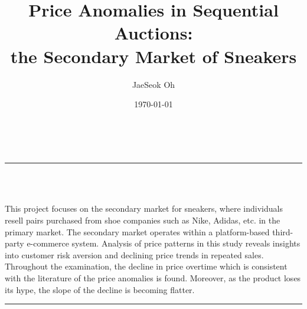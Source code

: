 \documentclass[a4paper]{article}
\title{\Huge{\bf{Price Anomalies in Sequential Auctions:}} \\
		 \huge the Secondary Market of Sneakers}
\author{\Large{JaeSeok Oh}}
\date{\today}
\theoremstyle{definition}
\theoremstyle{definition}
\theoremstyle{remark}
\begin{document}
	
\begin{titlepage}
	\maketitle
	\begin{Large}
		\begin{center}
			\vspace{3cm}
			\vspace{2cm} \\
		\end{center}
	\end{Large}
	\begin{large}
	\begin{center}	
	\noindent\rule{17cm}{0.4pt} \\
	 \\
	\end{center}

			 This project focuses on the secondary market for sneakers, where individuals resell pairs purchased from shoe companies such as Nike, Adidas, etc. in the primary market. The secondary market operates within a platform-based third-party e-commerce system. Analysis of price patterns in this study reveals insights into customer risk aversion and declining price trends in repeated sales. Throughout the examination, the decline in price overtime which is consistent with the literature of the price anomalies is found.  Moreover, as the product loses its hype, the slope of the decline is becoming flatter. \\
	\noindent\rule{17cm}{0.4pt} \\
	\thispagestyle{empty}
	\end{large}
\end{titlepage}

\newpage
\end{document}
